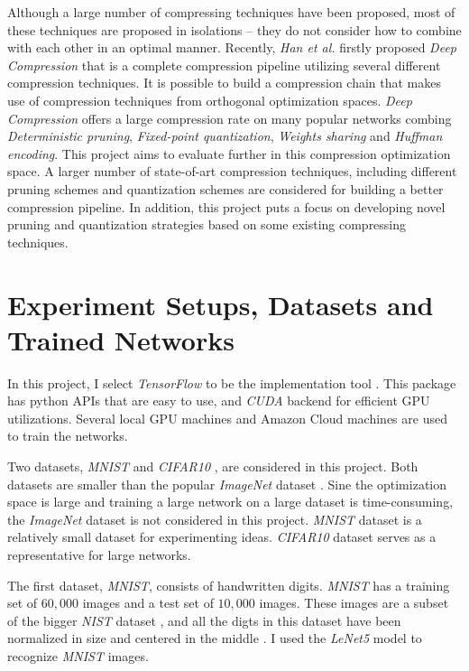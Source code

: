 \documentclass[a4paper,12pt]{report}
\begin{document}
Although a large number of compressing techniques have been proposed, most of these
techniques are proposed in isolations -- they do not consider how
to combine with each other in an optimal manner.
Recently, \textit{Han et al.} firstly proposed \textit{Deep Compression} that is
a complete compression pipeline utilizing several different compression techniques.
It is possible to build a compression chain that makes use of compression techniques
from orthogonal optimization spaces.
\textit{Deep Compression} offers a large compression rate on many popular networks
combing \textit{Deterministic pruning}, \textit{Fixed-point quantization},
\textit{Weights sharing} and \textit{Huffman encoding}.
This project aims to evaluate further in this compression optimization space.
A larger number of state-of-art compression techniques, including different pruning
schemes and quantization schemes are considered for building a better compression pipeline.
In addition, this project puts a focus on developing novel pruning and
quantization strategies based on some existing compressing techniques.



\section{Experiment Setups, Datasets and Trained Networks}
In this project, I select \textit{TensorFlow} to be the implementation tool \cite{tensorflow}.
This package has python APIs that are easy to use, and \textit{CUDA} backend for
efficient GPU utilizations.
Several local GPU machines and Amazon Cloud machines are used to train the networks.

Two datasets, \textit{MNIST} \cite{lecun1998mnist} and \textit{CIFAR10} \cite{krizhevsky2014cifar},
are considered in this project.
Both datasets are smaller than the popular \textit{ImageNet} dataset \cite{deng2009imagenet}.
Sine the optimization space is large and training a large network on a large dataset
is time-consuming, the \textit{ImageNet} dataset is not considered in this project.
\textit{MNIST} dataset is a relatively small dataset for experimenting ideas.
\textit{CIFAR10} dataset serves as a representative for large networks.

The first dataset, \textit{MNIST}, consists of handwritten digits.
\textit{MNIST} has a training set of $60,000$ images and a test set of $10,000$
images.
These images are a subset of the bigger \textit{NIST} dataset \cite{grother1995nist},
and all the digts in this dataset have been normalized in size and centered in
the middle \cite{lecun1998mnist}.
I used the \textit{LeNet5} model \cite{lecun2015lenet} to recognize \textit{MNIST} images.
\end{document}
